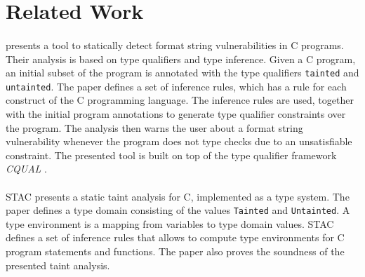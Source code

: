 \section{Related Work}\label{sec:related}

\paragraph{\cite{Shankar:2001:DFS}} presents a tool to statically
detect format string vulnerabilities in C programs. Their analysis
is based on type qualifiers and type inference. Given a C program,
an initial subset of the program is annotated with the type qualifiers
\texttt{tainted} and \texttt{untainted}. The paper defines a set
of inference rules, which has a rule for each construct of
the C programming language. The inference rules are used, together
with the initial program annotations to generate type qualifier
constraints over the program. The analysis then warns the user
about a format string vulnerability whenever the program does not
type checks due to an unsatisfiable constraint. The presented tool
is built on top of the type qualifier framework \textit{CQUAL} 
\cite{Foster:pldi99}.

\paragraph{\cite{Dimitru:2009:STAC}} STAC presents a static taint
analysis for C, implemented as a type system. The paper defines a type
domain consisting of the values \texttt{Tainted} and \texttt{Untainted}.
A type environment is a mapping from variables to type domain values.
STAC defines a set of inference rules that allows to compute
type environments for C program statements and functions. The paper
also proves the soundness of the presented taint analysis.



